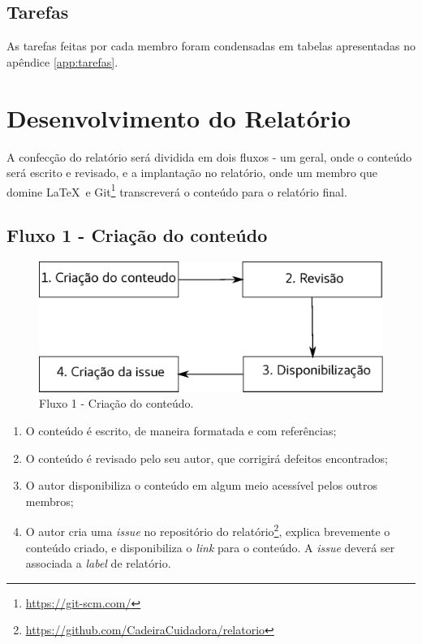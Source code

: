 \subsection{Tarefas}

As tarefas feitas por cada membro foram condensadas em tabelas apresentadas no apêndice \ref{app:tarefas}.


\section{Desenvolvimento do Relatório}

A confecção do relatório será dividida em dois fluxos - um geral, onde o
conteúdo será escrito e revisado, e a implantação no relatório, onde um
membro que domine \LaTeX\ e
Git\footnote{\url{https://git-scm.com/}} transcreverá o conteúdo para o
relatório final.

\subsection{Fluxo 1 - Criação do conteúdo}

\begin{figure}[H]
  \centering
    \includegraphics[width=\textwidth]{figuras/fluxo1.eps}
  \caption{Fluxo 1 - Criação do conteúdo.}
  \label{fig:fluxo1}
\end{figure}

\begin{enumerate}
  \item O conteúdo é escrito, de maneira formatada e com referências;
  \item O conteúdo é revisado pelo seu autor, que corrigirá defeitos encontrados;
  \item O autor disponibiliza o conteúdo em algum meio acessível pelos outros membros;
  \item O autor cria uma \textit{issue} no repositório do
    relatório\footnote{\url{https://github.com/CadeiraCuidadora/relatorio}}, explica brevemente
    o conteúdo criado, e disponibiliza o \textit{link} para o conteúdo. A \textit{issue} deverá ser associada a \textit{label} de relatório.
\end{enumerate}

